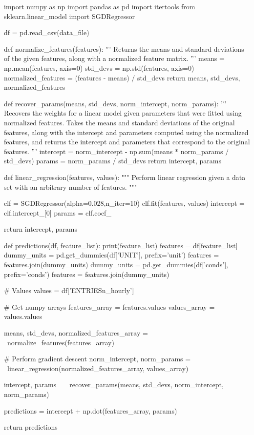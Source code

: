 \documentclass{article}
\numberwithin{questionCtr}{section}
\numberwithin{problemCtr}{section}
\begin{document}
\begin{python1}
import numpy as np
import pandas as pd
import itertools
from sklearn.linear_model import SGDRegressor

df = pd.read_csv(data_file)

def normalize_features(features):
    ''' 
    Returns the means and standard deviations of the given features, along with
    a normalized feature matrix.
    ''' 
    means = np.mean(features, axis=0)
    std_devs = np.std(features, axis=0)
    normalized_features = (features - means) / std_devs
    return means, std_devs, normalized_features
\end{python1}
\begin{python1}
def recover_params(means, std_devs, norm_intercept, norm_params):
    ''' 
    Recovers the weights for a linear model given parameters that were fitted
    using normalized features. Takes the means and standard deviations of the
    original features, along with the intercept and parameters computed using
    the normalized features, and returns the intercept and parameters that
    correspond to the original features.
    ''' 
    intercept = norm_intercept - np.sum(means * norm_params / std_devs)
    params = norm_params / std_devs
    return intercept, params

def linear_regression(features, values):
    """
    Perform linear regression given a data set with an arbitrary number of
    features.
    """    

    clf = SGDRegressor(alpha=0.028,n_iter=10)
    clf.fit(features, values)
    intercept = clf.intercept_[0]
    params = clf.coef_
    
    return intercept, params

\end{python1}
\begin{python1}
def predictions(df, feature_list):
    print(feature_list)
    features = df[feature_list]
    dummy_units = pd.get_dummies(df['UNIT'], prefix='unit')
    features = features.join(dummy_units)
    dummy_units = pd.get_dummies(df['conds'], prefix='conds')
    features = features.join(dummy_units)

    # Values
    values = df['ENTRIESn_hourly']
    
    # Get numpy arrays
    features_array = features.values
    values_array = values.values
    
    means, std_devs, normalized_features_array = \
        normalize_features(features_array)

    # Perform gradient descent
    norm_intercept, norm_params = \
        linear_regression(normalized_features_array, values_array)
    
    intercept, params = \
        recover_params(means, std_devs, norm_intercept, norm_params)
    
    predictions = intercept + np.dot(features_array, params)
    
    return predictions

\end{python1}
\end{document}
